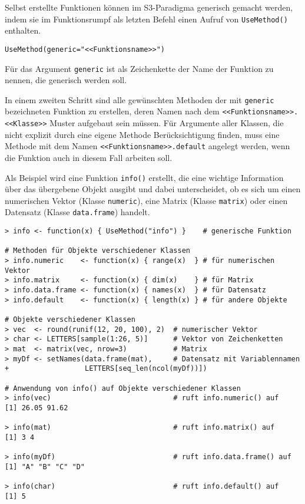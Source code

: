 Selbst erstellte Funktionen können im S3-Paradigma generisch gemacht werden, indem sie im Funktionsrumpf als letzten Befehl einen Aufruf von \lstinline!UseMethod()! enthalten.
\begin{lstlisting}
UseMethod(generic="<<Funktionsname>>")
\end{lstlisting}

Für das Argument \lstinline!generic! ist als Zeichenkette der Name der Funktion zu nennen, die generisch werden soll.

In einem zweiten Schritt sind alle gewünschten Methoden der mit \lstinline!generic! bezeichneten Funktion zu erstellen, deren Namen nach dem \lstinline!<<Funktionsname>>.<<Klasse>>! Muster aufgebaut sein müssen. Für Argumente aller Klassen, die nicht explizit durch eine eigene Methode Berücksichtigung finden, muss eine Methode mit dem Namen \lstinline!<<Funktionsname>>.default! angelegt werden, wenn die Funktion auch in diesem Fall arbeiten soll.

Als Beispiel wird eine Funktion \lstinline!info()! erstellt, die eine wichtige Information über das übergebene Objekt ausgibt und dabei unterscheidet, ob es sich um einen numerischen Vektor (Klasse \lstinline!numeric!), eine Matrix (Klasse \lstinline!matrix!) oder einen Datensatz (Klasse \lstinline!data.frame!) handelt.
\begin{lstlisting}
> info <- function(x) { UseMethod("info") }    # generische Funktion

# Methoden für Objekte verschiedener Klassen
> info.numeric    <- function(x) { range(x)  } # für numerischen Vektor
> info.matrix     <- function(x) { dim(x)    } # für Matrix
> info.data.frame <- function(x) { names(x)  } # für Datensatz
> info.default    <- function(x) { length(x) } # für andere Objekte

# Objekte verschiedener Klassen
> vec  <- round(runif(12, 20, 100), 2)  # numerischer Vektor
> char <- LETTERS[sample(1:26, 5)]      # Vektor von Zeichenketten
> mat  <- matrix(vec, nrow=3)           # Matrix
> myDf <- setNames(data.frame(mat),     # Datensatz mit Variablennamen
+                  LETTERS[seq_len(ncol(myDf))])
     
# Anwendung von info() auf Objekte verschiedener Klassen
> info(vec)                             # ruft info.numeric() auf
[1] 26.05 91.62

> info(mat)                             # ruft info.matrix() auf
[1] 3 4

> info(myDf)                            # ruft info.data.frame() auf
[1] "A" "B" "C" "D"

> info(char)                            # ruft info.default() auf
[1] 5
\end{lstlisting}

